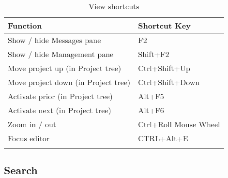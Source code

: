 {\small 
\begin{longtable}{|l|l|}\hline
\textbf{Function}		            &   \textbf{Shortcut Key}   \\ \hline
\endhead   %
Show / hide Messages pane	        &	F2                      \\ \hline
Show / hide Management pane 	    &	Shift+F2                \\ \hline
Move project up (in Project tree) 	&   Ctrl+Shift+Up           \\ \hline
Move project down (in Project tree) &   Ctrl+Shift+Down         \\ \hline
Activate prior (in Project tree)    & 	Alt+F5                  \\ \hline
Activate next (in Project tree)     &	Alt+F6                  \\ \hline
Zoom in / out 	                    &   Ctrl+Roll Mouse Wheel   \\ \hline
Focus editor 	                    &   CTRL+Alt+E              \\ \hline
\caption{View shortcuts}
\end{longtable}
}

\subsection{Search}

